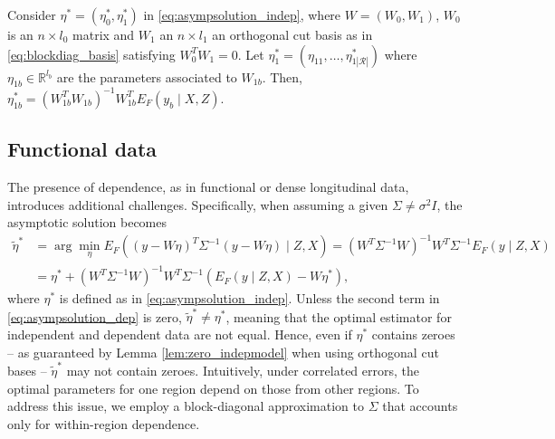 \begin{lemma}
Consider $\eta^*=(\eta_0^*,\eta_1^*)$ in \eqref{eq:asympsolution_indep}, where $W=(W_0,W_1)$, $W_0$ is an $n \times l_0$ matrix and $W_1$ an $n \times l_1$ an orthogonal cut basis as in \eqref{eq:blockdiag_basis} satisfying $W_0^T W_1=0$.
Let $\eta_1^*= (\eta_{11},\ldots,\eta_{1|\mathcal{R}|}^*)$ where $\eta_{1b} \in \mathbb{R}^{l_b}$ are the parameters associated to $W_{1b}$.
Then, $ \eta_{1b}^*= (W_{1b}^T W_{1b})^{-1} W_{1b}^T E_F(y_b \mid X,Z)$.
\label{lem:zero_indepmodel}
\end{lemma}



\subsection{Functional data}
\label{ssec:misspec_fda}

The presence of dependence, as in functional or dense longitudinal data, introduces additional challenges. 
Specifically, when assuming a given $\Sigma \neq \sigma^2 I$, the asymptotic solution becomes
\begin{align}
 \widetilde{\eta}^*&= \arg\min_\eta E_F \left( (y - W\eta)^T \Sigma^{-1} (y - W\eta) \mid Z,X \right)=
(W^T \Sigma^{-1} W)^{-1} W^T \Sigma^{-1} E_F(y \mid Z,X)
\nonumber \\
&=\eta^* + (W^T \Sigma^{-1} W)^{-1} W^T \Sigma^{-1} \left( E_F(y \mid Z,X) - W\eta^* \right),
\label{eq:asympsolution_dep}
\end{align}
where $\eta^*$ is defined as in \eqref{eq:asympsolution_indep}. Unless the second term in \eqref{eq:asympsolution_dep} is zero, $\tilde{\eta}^* \neq \eta^*$,
meaning that the optimal estimator for independent and dependent data are not equal.
Hence, even if $\eta^*$ contains zeroes -- as guaranteed by Lemma \ref{lem:zero_indepmodel}  when using orthogonal cut bases --  $\tilde{\eta}^*$ may not contain zeroes.
Intuitively, under correlated errors,  the optimal parameters for one region depend on those from other regions. To address this issue, we employ a block-diagonal approximation to $\Sigma$ that accounts only for within-region dependence.

